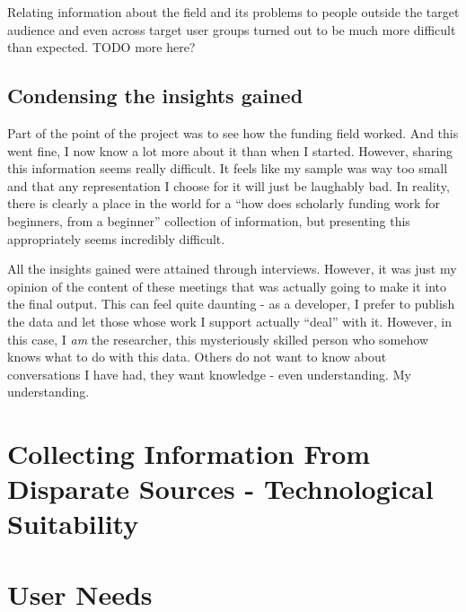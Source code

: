 Relating information about the field and its problems to people outside the target audience and even across target user groups turned out to be much more difficult than expected. TODO more here?

\subsection{Condensing the insights gained}
Part of the point of the project was to see how the funding field worked. And this went fine, I now know a lot more about it than when I started. However, sharing this information seems really difficult. It feels like my sample was way too small and that any representation I choose for it will just be laughably bad. In reality, there is clearly a place in the world for a ``how does scholarly funding work for beginners, from a beginner'' collection of information, but presenting this appropriately seems incredibly difficult.

All the insights gained were attained through interviews. However, it was just my opinion of the content of these meetings that was actually going to make it into the final output. This can feel quite daunting - as a developer, I prefer to publish the data and let those whose work I support actually ``deal'' with it. However, in this case, I \emph{am} the researcher, this mysteriously skilled person who somehow knows what to do with this data. Others do not want to know about conversations I have had, they want knowledge - even understanding. My understanding. %


\section{Collecting Information From Disparate Sources - Technological Suitability}

\section{User Needs}
